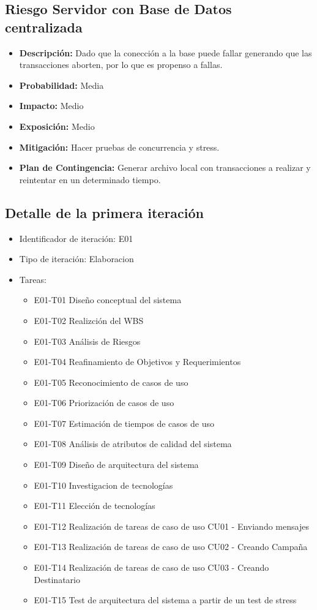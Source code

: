 \documentclass[a4paper, 11pt]{article}
\begin{document}
\subsection{Riesgo Servidor con Base de Datos centralizada}
\begin{itemize}

\item \textbf{Descripci\'on:} Dado que la conección a la base puede fallar generando que las transacciones aborten, por lo que es propenso a fallas.
\item \textbf{Probabilidad:} Media
\item \textbf{Impacto:} Medio
\item \textbf{Exposici\'on:} Medio
\item \textbf{Mitigaci\'on:} Hacer pruebas de concurrencia y stress.
\item \textbf{Plan de Contingencia:} Generar archivo local con transacciones a realizar y reintentar en un determinado tiempo.
\end{itemize}





\subsection{Detalle de la primera iteraci\'on}
\begin{itemize}
\item Identificador de iteraci\'on: E01
\item Tipo de iteraci\'on: Elaboracion
\item Tareas:
\begin{itemize}
\item{E01-T01} Diseño conceptual del sistema
\item{E01-T02} Realizción del WBS
\item{E01-T03} Análisis de Riesgos
\item{E01-T04} Reafinamiento de Objetivos y Requerimientos
\item{E01-T05} Reconocimiento de casos de uso
\item{E01-T06} Priorizaci\'on de casos de uso 
\item{E01-T07} Estimación de tiempos de casos de uso
\item{E01-T08} Análisis de atributos de calidad del sistema
\item{E01-T09} Diseño de arquitectura del sistema
\item{E01-T10} Investigacion de tecnolog\'ias
\item{E01-T11} Elección de tecnologías
\item{E01-T12} Realización de tareas de caso de uso CU01 - Enviando mensajes
\item{E01-T13} Realización de tareas de caso de uso CU02 - Creando Campa\~na
\item{E01-T14} Realización de tareas de caso de uso CU03 - Creando Destinatario
\item{E01-T15} Test de arquitectura del sistema a partir de un test de stress
\end{itemize}
\end{itemize}
\end{document}
